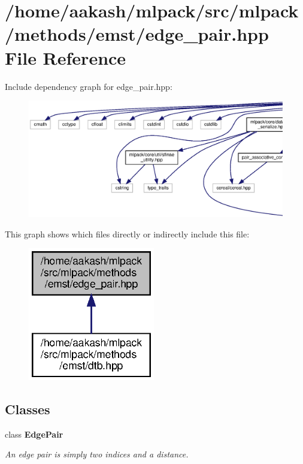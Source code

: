 \section{/home/aakash/mlpack/src/mlpack/methods/emst/edge\+\_\+pair.hpp File Reference}
\label{edge__pair_8hpp}
Include dependency graph for edge\+\_\+pair.\+hpp\+:
\nopagebreak
\begin{figure}[H]
\begin{center}
\leavevmode
\includegraphics[width=350pt]{edge__pair_8hpp__incl}
\end{center}
\end{figure}
This graph shows which files directly or indirectly include this file\+:
\nopagebreak
\begin{figure}[H]
\begin{center}
\leavevmode
\includegraphics[width=157pt]{edge__pair_8hpp__dep__incl}
\end{center}
\end{figure}
\subsection*{Classes}
\begin{DoxyCompactItemize}
\item 
class \textbf{ Edge\+Pair}
\begin{DoxyCompactList}\small\item\em An edge pair is simply two indices and a distance. \end{DoxyCompactList}\end{DoxyCompactItemize}
